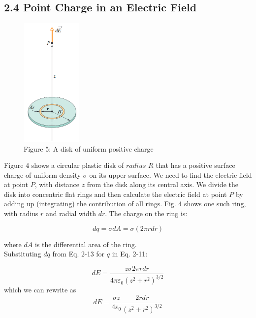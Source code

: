 \documentclass[12pt, a4paper]{article}
\begin{document}
	
		\subsection*{2.4 Point Charge in an Electric Field}
		
		\begin{figure}
			\centering
			\includegraphics[width=3cm]{Physics2_PNGs/elec-charged-disk.png}
			\caption*{Figure 5: A disk of uniform positive charge}
			\label{fig:charged-disk}
		\end{figure}
	
		Figure 4 shows a circular plastic disk of $radius$ $R$ that has a positive surface charge of uniform density $\sigma$ on its upper surface. We need to find the electric field at point $P$, with distance $z$ from the disk along its central axis.
		We divide the disk into concentric flat rings and then calculate the electric field at point $P$ by adding up (integrating) the contribution of all rings. Fig. 4 shows one such ring, with radius $r$ and radial width $dr$. The charge on the ring is:
		
		\begin{equation*}
			dq = \sigma dA = \sigma (2\pi rdr)
			\tag{2-13}
		\end{equation*} 
		
		where $dA$ is the differential area of the ring. \\
		Substituting $dq$ from Eq. 2-13 for $q$ in Eq. 2-11:
		
		\begin{equation*}
			dE = \frac{z\sigma 2 \pi rdr}{4\pi\varepsilon_0(z^2 + r^2)^{3/2}}
		\end{equation*}
		which we can rewrite as
		\begin{equation*}
			dE = \frac{\sigma z}{4\varepsilon_0} \frac{2rdr}{(z^2 + r^2)^{3/2}}
			\tag{2-14}
		\end{equation*}
	
\end{document}

